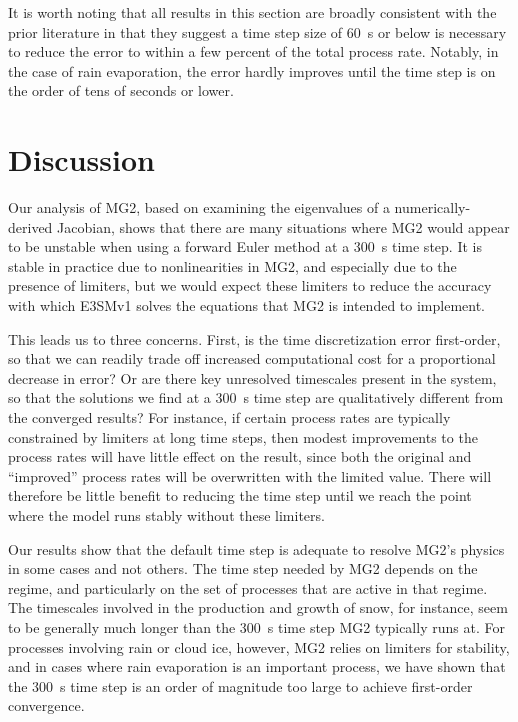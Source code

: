 \documentclass [11pt, proquest] {uwthesis}[2020/02/24]
\begin{document}
It is worth noting that all results in this section are broadly consistent with the prior literature in that they suggest a time step size of \SI{60}{\second} or below is necessary to reduce the error to within a few percent of the total process rate. Notably, in the case of rain evaporation, the error hardly improves until the time step is on the order of tens of seconds or lower.

\section{Discussion} \label{sec:MG2-discussion}

Our analysis of MG2, based on examining the eigenvalues of a numerically-derived Jacobian, shows that there are many situations where MG2 would appear to be unstable when using a forward Euler method at a \SI{300}{\second} time step. It is stable in practice due to nonlinearities in MG2, and especially due to the presence of limiters, but we would expect these limiters to reduce the accuracy with which E3SMv1 solves the equations that MG2 is intended to implement.

This leads us to three concerns. First, is the time discretization error first-order, so that we can readily trade off increased computational cost for a proportional decrease in error? Or are there key unresolved timescales present in the system, so that the solutions we find at a \SI{300}{\second} time step are qualitatively different from the converged results? For instance, if certain process rates are typically constrained by limiters at long time steps, then modest improvements to the process rates will have little effect on the result, since both the original and ``improved'' process rates will be overwritten with the limited value. There will therefore be little benefit to reducing the time step until we reach the point where the model runs stably without these limiters.

Our results show that the default time step is adequate to resolve MG2's physics in some cases and not others. The time step needed by MG2 depends on the regime, and particularly on the set of processes that are active in that regime. The timescales involved in the production and growth of snow, for instance, seem to be generally much longer than the \SI{300}{\second} time step MG2 typically runs at. For processes involving rain or cloud ice, however, MG2 relies on limiters for stability, and in cases where rain evaporation is an important process, we have shown that the \SI{300}{\second} time step is an order of magnitude too large to achieve first-order convergence.
\end{document}

